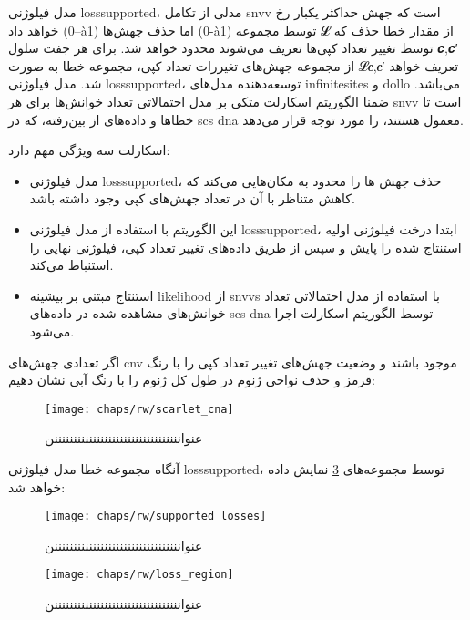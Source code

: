 مدل فیلوژنی \gls{losssupported}،  مدلی از تکامل \gls{snvv} است که جهش حداکثر یکبار رخ خواهد داد (0--à1) اما حذف جهش‌ها (0-à1) توسط مجموعه
𝓛
از مقدار خطا حذف که توسط تغییر تعداد کپی‌ها تعریف می‌شوند محدود خواهد شد. برای هر جفت سلول
𝒄,𝒄′
از مجموعه جهش‌های تغیررات تعداد کپی، مجموعه خطا به صورت
𝓛𝒄,𝒄′
تعریف خواهد شد. مدل فیلوژنی \gls{losssupported}، توسعه‌دهنده مدل‌های \gls{infinitesites} و \gls{dollo} می‌باشد. ضمنا الگوریتم اسکارلت متکی بر مدل احتمالاتی تعداد خوانش‌ها برای هر \gls{snvv} است تا خطاها و داده‌های از بین‌رفته، که در  \gls{scs} \gls{dna} معمول هستند، را مورد توجه قرار می‌دهد. 

اسکارلت سه ویژگی مهم دارد: 

\begin{itemize}
	\item     مدل فیلوژنی \gls{losssupported}، حذف جهش ها را محدود به مکان‌هایی می‌کند که کاهش متناظر با آن در تعداد جهش‌های کپی وجود داشته باشد. 
	
	\item 	این الگوریتم با استفاده از مدل فیلوژنی \gls{losssupported}، ابتدا درخت فیلوژنی اولیه استنتاج شده را پایش  و سپس از طریق داده‌های تغییر تعداد کپی، فیلوژنی نهایی را استنباط می‌کند. 
	\item	استنتاج مبتنی بر بیشینه  \gls{likelihood}  از \glspl{snvv} با استفاده از مدل احتمالاتی تعداد خوانش‌های مشاهده شده در داده‌های   \gls{scs} \gls{dna} توسط الگوریتم اسکارلت اجرا می‌شود.  
\end{itemize}




اگر تعدادی جهش‌های \gls{cnv} موجود باشند و  وضعیت جهش‌های تغییر تعداد کپی را با رنگ قرمز و حذف نواحی ژنوم در طول کل ژنوم را با رنگ آبی نشان دهیم:


\begin{figure}[!ht]
	\centerline{\texttt{[image: chaps/rw/scarlet\_cna]}}
	\caption{عنوانننننننننننننننننننننننننننننننننن}
	\label{fig:ch_rw:scarlet_cna}
\end{figure}

آنگاه مجموعه خطا مدل فیلوژنی \gls{losssupported}، توسط مجموعه‌های \ref{fig:ch_rw:loss_region} نمایش داده خواهد شد: 

\begin{figure}[!ht]
	\centerline{\texttt{[image: chaps/rw/supported\_losses]}}
	\caption{عنوانننننننننننننننننننننننننننننننننن}
	\label{fig:ch_rw:supported_losses}
\end{figure}

\begin{figure}[!ht]
	\centerline{\texttt{[image: chaps/rw/loss\_region]}}
	\caption{عنوانننننننننننننننننننننننننننننننننن}
	\label{fig:ch_rw:loss_region}
\end{figure}


